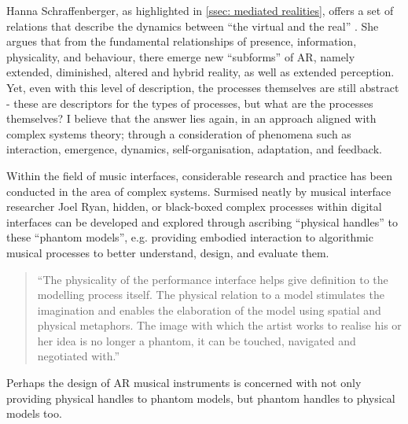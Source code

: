 Hanna Schraffenberger, as highlighted in \autoref{ssec: mediated realities}, offers a set of relations that describe the dynamics between “the virtual and the real” \citeyearpar{schraffenberger2018}. She argues that from the fundamental relationships of presence, information, physicality, and behaviour, there emerge new “subforms” of AR, namely extended, diminished, altered and hybrid reality, as well as extended perception. Yet, even with this level of description, the processes themselves are still abstract - these are descriptors for the types of processes, but what are the processes themselves? I believe that the answer lies again, in an approach aligned with complex systems theory; through a consideration of phenomena such as interaction, emergence, dynamics, self-organisation, adaptation, and feedback.

Within the field of music interfaces, considerable research and practice has been conducted in the area of complex systems. Surmised neatly by musical interface researcher Joel Ryan, hidden, or black-boxed complex processes within digital interfaces can be developed and explored through ascribing “physical handles” to these “phantom models”, e.g. providing embodied interaction to algorithmic musical processes to better understand, design, and evaluate them.
\begin{quote}
    “The physicality of the performance interface helps give definition to the modelling process itself. The physical relation to a model stimulates the imagination and enables the elaboration of the model using spatial and physical metaphors. The image with which the artist works to realise his or her idea is no longer a phantom, it can be touched, navigated and negotiated with.” \citeyearpar[p.5]{ryan1991}
\end{quote}
Perhaps the design of AR musical instruments is concerned with not only providing physical handles to phantom models, but phantom handles to physical models too.

